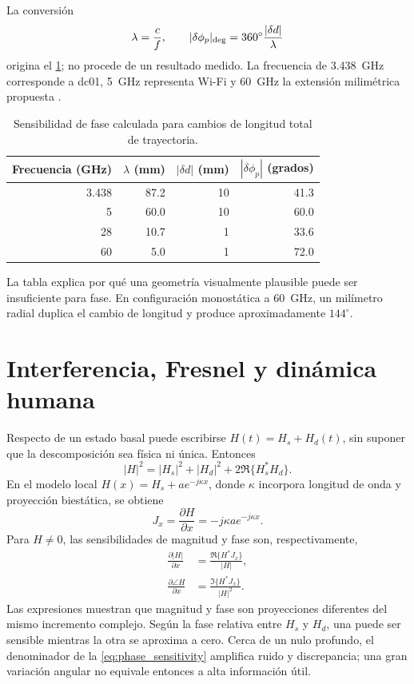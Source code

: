 La conversión
\begin{equation}
\lambda=\frac{c}{f},\qquad
|\delta\phi_p|_{\rm deg}=360^\circ\frac{|\delta d|}{\lambda}
\label{eq:phase_length_conversion}
\end{equation}
origina el \cref{tab:wavelength_metrology}; no procede de un resultado medido. La frecuencia de \SI{3.438}{GHz} corresponde a dc01, \SI{5}{GHz} representa Wi-Fi y \SI{60}{GHz} la extensión milimétrica propuesta \citep{Euchner2023DICHASUSdcxx,TIIWRL6432BOOST}.

\begin{table}[htbp]
\centering
\caption{Sensibilidad de fase calculada para cambios de longitud total de trayectoria.}
\label{tab:wavelength_metrology}
\begin{tabular}{rrrr}
\toprule
Frecuencia (GHz) & $\lambda$ (mm) & $|\delta d|$ (mm) & $|\delta\phi_p|$ (grados)\\
\midrule
3.438 & 87.2 & 10 & 41.3\\
5 & 60.0 & 10 & 60.0\\
28 & 10.7 & 1 & 33.6\\
60 & 5.0 & 1 & 72.0\\
\bottomrule
\end{tabular}
\end{table}

La tabla explica por qué una geometría visualmente plausible puede ser insuficiente para fase. En configuración monostática a \SI{60}{GHz}, un milímetro radial duplica el cambio de longitud y produce aproximadamente $144^\circ$.

\section{Interferencia, Fresnel y dinámica humana}

Respecto de un estado basal puede escribirse $H(t)=H_s+H_d(t)$, sin suponer que
la descomposición sea física ni única. Entonces
\[
|H|^2=|H_s|^2+|H_d|^2+2\Re\{H_s^*H_d\}.
\]
En el modelo local $H(x)=H_s+a e^{-j\kappa x}$, donde $\kappa$ incorpora longitud
de onda y proyección biestática, se obtiene
\begin{equation}
J_x=\frac{\partial H}{\partial x}
=-j\kappa a e^{-j\kappa x}.
\label{eq:single_dynamic_path_jacobian}
\end{equation}
Para $H\neq0$, las sensibilidades de magnitud y fase son, respectivamente,
\begin{align}
\frac{\partial |H|}{\partial x}
&=\frac{\Re\{H^*J_x\}}{|H|},
\label{eq:magnitude_sensitivity}\\
\frac{\partial \angle H}{\partial x}
&=\frac{\Im\{H^*J_x\}}{|H|^2}.
\label{eq:phase_sensitivity}
\end{align}
Las expresiones muestran que magnitud y fase son proyecciones diferentes del mismo
incremento complejo. Según la fase relativa entre $H_s$ y $H_d$, una puede ser
sensible mientras la otra se aproxima a cero. Cerca de un nulo profundo, el
denominador de la \cref{eq:phase_sensitivity} amplifica ruido y discrepancia; una
gran variación angular no equivale entonces a alta información útil.


